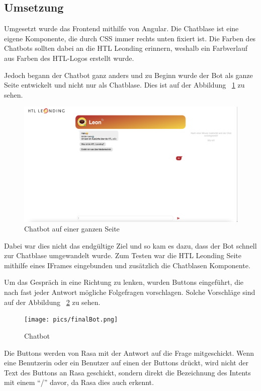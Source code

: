 \subsection{Umsetzung}
Umgesetzt wurde das Frontend mithilfe von Angular.
Die Chatblase ist eine eigene Komponente, die durch CSS immer rechts unten fixiert ist.
Die Farben des Chatbots sollten dabei an die HTL Leonding erinnern, weshalb ein Farbverlauf aus Farben des HTL-Logos erstellt wurde.

Jedoch begann der Chatbot ganz anders und zu Beginn wurde der Bot als ganze Seite entwickelt und nicht nur als Chatblase.
Dies ist auf der Abbildung ~\ref{fig:impl:conceptBotFullPage} zu sehen.

\begin{figure}[hbt!]
    \centering
    \includegraphics[scale=0.25]{pics/fullPageBot}
    \caption{Chatbot auf einer ganzen Seite}
    \label{fig:impl:conceptBotFullPage}
\end{figure}

Dabei war dies nicht das endgültige Ziel und so kam es dazu, dass der Bot schnell zur Chatblase umgewandelt wurde.
Zum Testen war die HTL Leonding Seite mithilfe eines IFrames eingebunden und zusätzlich die Chatblasen Komponente.

Um das Gespräch in eine Richtung zu lenken, wurden Buttons eingeführt, die nach fast jeder Antwort mögliche Folgefragen vorschlagen.
Solche Vorschläge sind auf der Abbildung ~\ref{fig:impl:bot} zu sehen.

\begin{figure}[hbt!]
    \centering
    \texttt{[image: pics/finalBot.png]}
    \caption{Chatbot}
    \label{fig:impl:bot}
\end{figure}

Die Buttons werden von Rasa mit der Antwort auf die Frage mitgeschickt.
Wenn eine Benutzerin oder ein Benutzer auf einen der Buttons drückt, wird nicht der Text des Buttons an Rasa geschickt, sondern direkt die Bezeichnung des Intents mit einem ``/'' davor, da Rasa dies auch erkennt.

